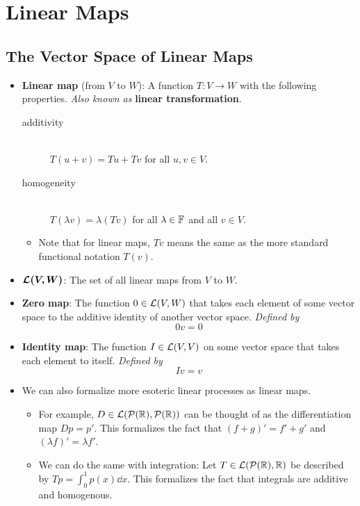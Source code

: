 \documentclass[../main.tex]{subfiles}
\begin{document}
\chapter{Linear Maps}
\section{The Vector Space of Linear Maps}
\begin{itemize}
    \item {}\textbf{Linear map} (from $V$ to $W$): A function $T:V\to W$ with the following properties. \emph{Also known as} \textbf{linear transformation}.
    \begin{description}
        \item[additivity]\hfill\\ $T(u+v)=Tu+Tv$ for all $u,v\in V$.
        \item[homogeneity]\hfill\\ $T(\lambda v)=\lambda(Tv)$ for all $\lambda\in\mathbb{F}$ and all $v\in V$. 
    \end{description}
    \begin{itemize}
        \item Note that for linear maps, $Tv$ means the same as the more standard functional notation $T(v)$.
    \end{itemize}
    \item $\bm{\mathcal{L}(V,W)}$: The set of all linear maps from $V$ to $W$.
    \item \textbf{Zero map}: The function $0\in\mathcal{L}(V,W)$ that takes each element of some vector space to the additive identity of another vector space. \emph{Defined by}
    \begin{equation*}
        0v = 0
    \end{equation*}
    \item \textbf{Identity map}: The function $I\in\mathcal{L}(V,V)$ on some vector space that takes each element to itself. \emph{Defined by}
    \begin{equation*}
        Iv = v
    \end{equation*}
    \item We can also formalize more esoteric linear processes as linear maps.
    \begin{itemize}
        \item For example, $D\in\mathcal{L}(\mathcal{P}(\mathbb{R}),\mathcal{P}(\mathbb{R}))$ can be thought of as the differentiation map $Dp=p'$. This formalizes the fact that $(f+g)'=f'+g'$ and $(\lambda f)'=\lambda f'$.
        \item We can do the same with integration: Let $T\in\mathcal{L}(\mathcal{P}(\mathbb{R}),\mathbb{R})$ be described by $Tp=\int_0^1p(x)\dd{x}$. This formalizes the fact that integrals are additive and homogenous.

\end{itemize}
\end{itemize}
\end{document}
